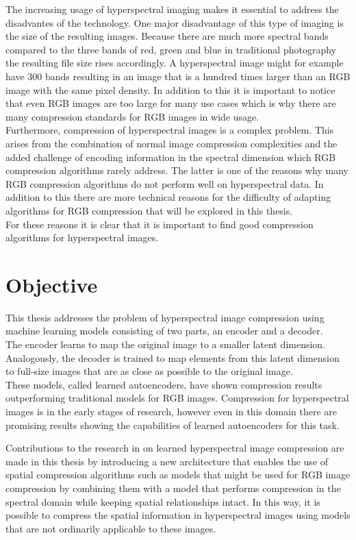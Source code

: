 The increasing usage of hyperspectral imaging makes it essential to address the disadvantes of the technology. One major disadvantage of this type of imaging is the size of the resulting images. Because there are much more spectral bands compared to the three bands of red, green and blue in traditional photography the resulting file size rises accordingly. A hyperspectral image might for example have 300 bands resulting in an image that is a hundred times larger than an RGB image with the same pixel density. In addition to this it is important to notice that even RGB images are too large for many use cases which is why there are many compression standards for RGB images in wide usage.\\
Furthermore, compression of hyperspectral images is a complex problem. This arises from the combination of normal image compression complexities and the added challenge of encoding information in the spectral dimension which RGB compression algorithms rarely address. The latter is one of the reasons why many RGB compression algorithms do not perform well on hyperspectral data. In addition to this there are more technical reasons for the difficulty of adapting algorithms for RGB compression that will be explored in this thesis.\\
For these reasons it is clear that it is important to find good compression algorithms for hyperspectral images.\\

\section{Objective\label{sec:objective}}

This thesis addresses the problem of hyperspectral image compression using machine learning models consisting of two parts, an encoder and a decoder.\\
The encoder learns to map the original image to a smaller latent dimension. Analogously, the decoder is trained to map elements from this latent dimension to full-size images that are as close as possible to the original image.\\
These models, called learned autoencoders, have shown compression results outperforming traditional models for RGB images. Compression for hyperspectral images is in the early stages of research, however even in this domain there are promising results showing the capabilities of learned autoencoders for this task.

Contributions to the research in on learned hyperspectral image compression are made in this thesis by introducing a new architecture that enables the use of spatial compression algorithms such as models that might be used for RGB image compression by combining them with a model that performs compression in the spectral domain while keeping spatial relationships intact. In this way, it is possible to compress the spatial information in hyperspectral images using models that are not ordinarily applicable to these images.


